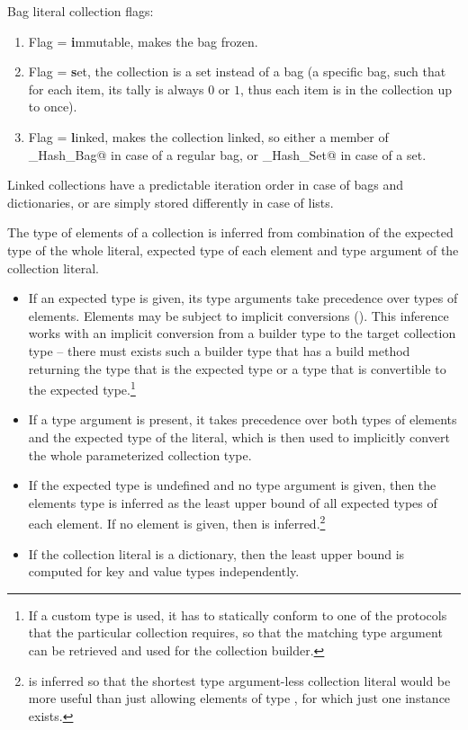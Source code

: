 Bag literal collection flags:

\begin{enumerate}
  \item Flag \lstinline@i@ = \textbf{i}mmutable, makes the bag frozen. 
  \item Flag \lstinline@s@ = \textbf{s}et, the collection is a set instead of a bag (a specific bag, such that for each item, its tally is always $0$ or $1$, thus each item is in the collection up to once). 
  \item Flag \lstinline@l@ = \textbf{l}inked, makes the collection linked, so either a member of \lstinline@Linked_Hash_Bag@ in case of a regular bag, or \lstinline@Linked_Hash_Set@ in case of a set. 
\end{enumerate}

Linked collections have a predictable iteration order in case of bags and dictionaries, or are simply stored differently in case of lists. 

The type of elements of a collection is inferred from combination of the expected type of the whole literal, expected type of each element and type argument of the collection literal. 
\begin{itemize}
  \item If an expected type is given, its type arguments take precedence over types of elements. Elements may be subject to implicit conversions (). This inference works with an implicit conversion from a builder type to the target collection type -- there must exists such a builder type that has a build method returning the type that is the expected type or a type that is convertible to the expected type.\footnote{If a custom type is used, it has to statically conform to one of the protocols that the particular collection requires, so that the matching type argument can be retrieved and used for the collection builder.} 
  \item If a type argument is present, it takes precedence over both types of elements and the expected type of the literal, which is then used to implicitly convert the whole parameterized collection type. 
  \item If the expected type is undefined and no type argument is given, then the elements type is inferred as the least upper bound of all expected types of each element. If no element is given, then  is inferred.\footnote{ is inferred so that the shortest type argument-less collection literal would be more useful than just allowing elements of type , for which just one instance exists.}
  \item If the collection literal is a dictionary, then the least upper bound is computed for key and value types independently.
\end{itemize}

